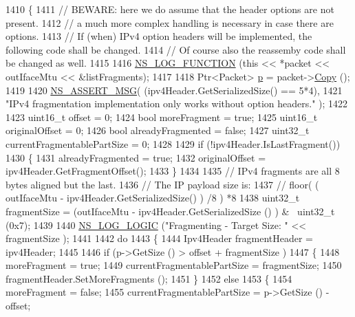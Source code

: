 \begin{DoxyCode}
1410 \{
1411   \textcolor{comment}{// BEWARE: here we do assume that the header options are not present.}
1412   \textcolor{comment}{// a much more complex handling is necessary in case there are options.}
1413   \textcolor{comment}{// If (when) IPv4 option headers will be implemented, the following code shall be changed.}
1414   \textcolor{comment}{// Of course also the reassemby code shall be changed as well.}
1415 
1416   \hyperlink{log-macros-disabled_8h_a90b90d5bad1f39cb1b64923ea94c0761}{NS\_LOG\_FUNCTION} (\textcolor{keyword}{this} << *packet << outIfaceMtu << &listFragments);
1417 
1418   Ptr<Packet> \hyperlink{lte__link__budget_8m_ac9de518908a968428863f829398a4e62}{p} = packet->\hyperlink{classns3_1_1Packet_a5d5c70802a5f77fc5f0001e0cfc1898b}{Copy} ();
1419 
1420   \hyperlink{assert_8h_aff5ece9066c74e681e74999856f08539}{NS\_ASSERT\_MSG}( (ipv4Header.GetSerializedSize() == 5*4),
1421                  \textcolor{stringliteral}{"IPv4 fragmentation implementation only works without option headers."} );
1422 
1423   uint16\_t offset = 0;
1424   \textcolor{keywordtype}{bool} moreFragment = \textcolor{keyword}{true};
1425   uint16\_t originalOffset = 0;
1426   \textcolor{keywordtype}{bool} alreadyFragmented = \textcolor{keyword}{false};
1427   uint32\_t currentFragmentablePartSize = 0;
1428 
1429   \textcolor{keywordflow}{if} (!ipv4Header.IsLastFragment())
1430     \{
1431       alreadyFragmented = \textcolor{keyword}{true};
1432       originalOffset = ipv4Header.GetFragmentOffset();
1433     \}
1434 
1435   \textcolor{comment}{// IPv4 fragments are all 8 bytes aligned but the last.}
1436   \textcolor{comment}{// The IP payload size is:}
1437   \textcolor{comment}{// floor( ( outIfaceMtu - ipv4Header.GetSerializedSize() ) /8 ) *8}
1438   uint32\_t fragmentSize = (outIfaceMtu - ipv4Header.GetSerializedSize () ) & ~uint32\_t (0x7);
1439 
1440   \hyperlink{group__logging_ga88acd260151caf2db9c0fc84997f45ce}{NS\_LOG\_LOGIC} (\textcolor{stringliteral}{"Fragmenting - Target Size: "} << fragmentSize );
1441 
1442   \textcolor{keywordflow}{do}
1443     \{
1444       Ipv4Header fragmentHeader = ipv4Header;
1445 
1446       \textcolor{keywordflow}{if} (p->GetSize () > offset + fragmentSize )
1447         \{
1448           moreFragment = \textcolor{keyword}{true};
1449           currentFragmentablePartSize = fragmentSize;
1450           fragmentHeader.SetMoreFragments ();
1451         \}
1452       \textcolor{keywordflow}{else}
1453         \{
1454           moreFragment = \textcolor{keyword}{false};
1455           currentFragmentablePartSize = p->GetSize () - offset;

\end{DoxyCode}
